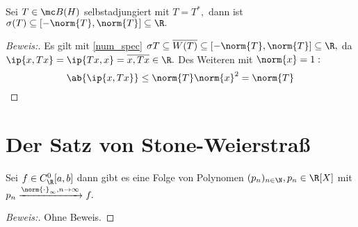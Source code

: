 \begin{theorem} Sei $T \in \mc B(H)$ selbstadjungiert mit $T = T^*,$ dann ist $\sigma(T) \subseteq [- \norm{T}, \norm{T}] \subseteq \R.$
	
	
	\begin{proof}[Beweis:] Es gilt mit \ref{num_spec} $\sigma{T} \subseteq \overline{W(T)} \subseteq [-\norm{T}, \norm{T}] \subseteq \R,$ da $\ip{x, Tx} = \ip{Tx, x} = \overline{x, Tx} \in \R.$ Des Weiteren mit $\norm{x} = 1:$ \[\ab{\ip{x, Tx}} \leq \norm{T}\norm{x}^2 = \norm{T}\]
		
	\end{proof}
	
\end{theorem}


\section{Der Satz von Stone-Weierstraß}

\begin{theorem} Sei $f \in C^0_{\R}[a, b]$ dann gibt es eine Folge von Polynomen $(p_n)_{n \in \N}, p_n \in \R[X]$ mit $p_n \xrightarrow{\norm{\cdot}_{\infty}, n \to \infty}f.$
	
	\begin{proof}[Beweis:] Ohne Beweis.
		
	\end{proof}
	
\end{theorem}


